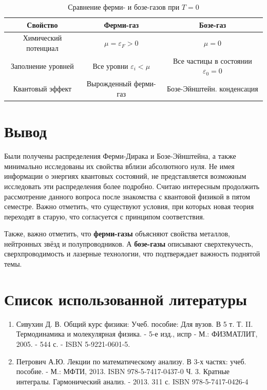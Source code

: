 \documentclass[A4]{article}
\begin{document}
\begin{center}
\begin{table}[h]
\centering
\renewcommand{\arraystretch}{1.5} %
\begin{tabular}{|c|c|c|}
\hline
\textbf{Свойство} & \textbf{Ферми-газ} & \textbf{Бозе-газ} \\
\hline
Химический потенциал & $\mu = \varepsilon_F > 0$ & $\mu = 0$ \\
\hline
Заполнение уровней & Все уровни $\varepsilon_i < \mu$ & Все частицы в состоянии $\varepsilon_0 = 0$ \\
\hline
Квантовый эффект & Вырожденный ферми-газ & Бозе-Эйнштейн. конденсация \\
\hline
\end{tabular}
\caption{Сравнение ферми- и бозе-газов при $T = 0$}
\label{tab:fermi_bose}
\end{table}
\end{center}

\section{Вывод}

    Были получены распределения Ферми-Дирака и Бозе-Эйнштейна, а также минимально исследованы их
    свойства вблизи абсолютного нуля. Не имея информации о энергиях квантовых состояний, не
    представляется возможным исследовать эти распределения более подробно. Считаю интересным
    продолжить рассмотрение данного вопроса после знакомства с квантовой физикой в пятом семестре.
    Важно отметить, что существуют условия, при которых новая теория переходят в старую, что
    согласуется с принципом соответствия.

    Также, важно отметить, что \textbf{ферми-газы} объясняют свойства металлов, нейтронных звёзд и полупроводников.
    А \textbf{бозе-газы} описывают сверхтекучесть, сверхпроводимость и лазерные технологии, что подтверждает важность поднятой темы.

\section{Список использованной литературы}

    \begin{enumerate}
        \item Сивухин Д. В. Общий курс физики: Учеб. пособие: Для вузов. В 5 т. Т. II. Термодинамика и
        молекулярная физика. - 5-е изд., испр - М.: ФИЗМАТЛИТ, 2005. - 544 с. - ISBN 5-9221-0601-5.

        \item Петрович А.Ю. Лекции по математическому анализу. В 3-х частях: учеб. пособие. - М.:
        МФТИ, 2013. ISBN 978-5-7417-0437-0 Ч. 3. Кратные интегралы. Гармонический анализ. - 2013.
        311 с. ISBN 978-5-7417-0426-4
    \end{enumerate}
\end{document}
